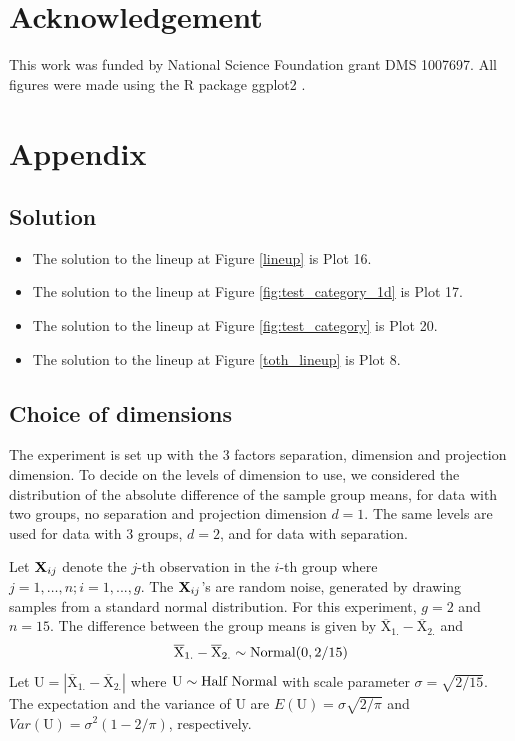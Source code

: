 \section*{Acknowledgement}
%
This work was funded by National Science Foundation grant DMS 1007697. All figures were made using the R \citep{r} package ggplot2 \citep{hadley:2009}.

%



\section*{Appendix}

\subsection*{Solution}
\begin{itemize}
\item The solution to the lineup at Figure \ref{lineup} is Plot 16. 
\item The solution to the lineup at Figure \ref{fig:test_category_1d} is Plot 17.
\item The solution to the lineup at Figure \ref{fig:test_category} is Plot 20.
\item The solution to the lineup at Figure \ref{toth_lineup} is Plot 8.

\end{itemize}

\subsection*{Choice of dimensions} \label{sec:theory}

The experiment is set up with the 3 factors separation, dimension and projection dimension. To decide on the levels of dimension to use, we considered the distribution of the absolute difference of the sample group means, for data with two groups, no separation and projection dimension $d=1$. The same levels are used for data with 3 groups, $d=2$, and for data with separation. 

Let ${\mbox{\boldmath {\bf X}}}_{ij}$ denote the $j$-th observation in the $i$-th group where $j = 1, \dots, n; i=1, ..., g$. The ${\mbox{\boldmath {\bf X}}}_{ij}$'s are random noise, generated by drawing samples from a standard normal distribution. For this experiment, $g = 2$  and $n = 15$. The difference between the group means is given by $\overline{\mbox{X}}_{1.} - \overline{\mbox{X}}_{2.}$%
and $$\overline{\mbox{X}}_{1.} - \overline{\mbox{X}}_{2.} \sim \hbox{Normal}(0, 2/15)$$ Let 
$\mbox{U} = |\overline{\mbox{X}} _{1.} - \overline{\mbox{X}}_{2.}|$ 
where $\mbox{U} \sim \hbox{Half Normal}$ with scale parameter $ \sigma = \sqrt{2/15}$.
The expectation and the variance of $\mbox{U}$ are 
$E(\mbox{U} ) = \sigma \sqrt{2/\pi}$ and 
$Var(\mbox{U}) = \sigma^2 (1 - 2/\pi)$, respectively.

